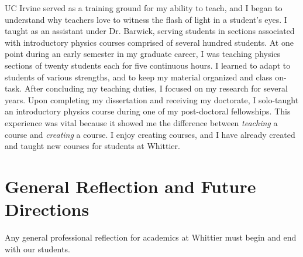 \documentclass[../../main.tex]{subfiles}
\begin{document}
UC Irvine served as a training ground for my ability to teach, and I began to understand why teachers love to witness the flash of light in a student's eyes.  I taught as an assistant under Dr. Barwick, serving students in sections associated with introductory physics courses comprised of several hundred students.  At one point during an early semester in my graduate career, I was teaching physics sections of twenty students each for five continuous hours.  I learned to adapt to students of various strengths, and to keep my material organized and class on-task.  After concluding my teaching duties, I focused on my research for several years.  Upon completing my dissertation and receiving my doctorate, I solo-taught an introductory physics course during one of my post-doctoral fellowships.  This experience was vital because it showed me the difference between \textit{teaching} a course and \textit{creating} a course.  I enjoy creating courses, and I have already created and taught new courses for students at Whittier.

\section{General Reflection and Future Directions}

Any general professional reflection for academics at Whittier must begin and end with our students.  
\end{document}
